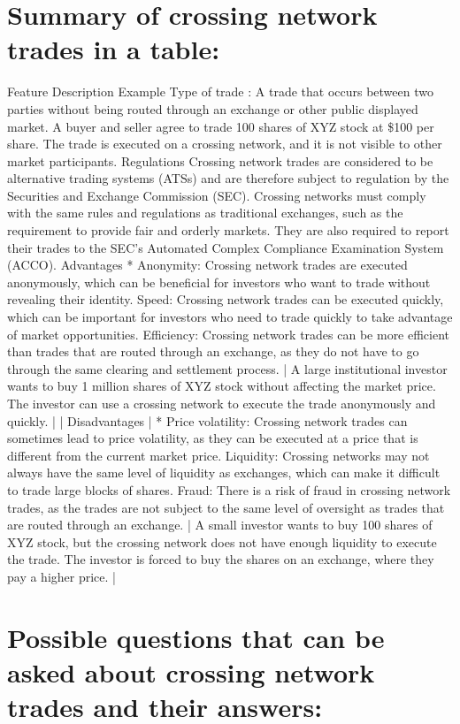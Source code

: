 \documentclass[11pt]{article}
\begin{document}
\section{Summary of crossing network trades in a table:}
\label{sec:org87d2698}

Feature	Description	Example
Type of trade	: A trade that occurs between two parties without being routed through an exchange or other public displayed market.	A buyer and seller agree to trade 100 shares of XYZ stock at \$100 per share. The trade is executed on a crossing network, and it is not visible to other market participants.
Regulations	Crossing network trades are considered to be alternative trading systems (ATSs) and are therefore subject to regulation by the Securities and Exchange Commission (SEC).	Crossing networks must comply with the same rules and regulations as traditional exchanges, such as the requirement to provide fair and orderly markets. They are also required to report their trades to the SEC's Automated Complex Compliance Examination System (ACCO).
Advantages	* Anonymity: Crossing network trades are executed anonymously, which can be beneficial for investors who want to trade without revealing their identity.
Speed: Crossing network trades can be executed quickly, which can be important for investors who need to trade quickly to take advantage of market opportunities.
Efficiency: Crossing network trades can be more efficient than trades that are routed through an exchange, as they do not have to go through the same clearing and settlement process. | A large institutional investor wants to buy 1 million shares of XYZ stock without affecting the market price. The investor can use a crossing network to execute the trade anonymously and quickly. | | Disadvantages | * Price volatility: Crossing network trades can sometimes lead to price volatility, as they can be executed at a price that is different from the current market price.
Liquidity: Crossing networks may not always have the same level of liquidity as exchanges, which can make it difficult to trade large blocks of shares.
Fraud: There is a risk of fraud in crossing network trades, as the trades are not subject to the same level of oversight as trades that are routed through an exchange. | A small investor wants to buy 100 shares of XYZ stock, but the crossing network does not have enough liquidity to execute the trade. The investor is forced to buy the shares on an exchange, where they pay a higher price. |


\section{Possible questions that can be asked about crossing network trades and their answers:}
\label{sec:org309138f}
\end{document}
